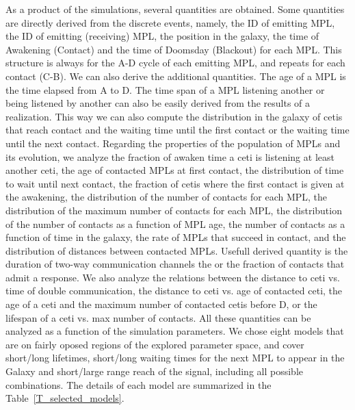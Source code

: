 As a product of the simulations, several quantities are obtained.
%
Some quantities are directly derived from the discrete events, namely,
the ID of emitting MPL, the ID of emitting (receiving) MPL, the
position in the galaxy, the time of Awakening (Contact) and the time
of Doomsday  (Blackout) for each MPL.
%
This structure is always for the A-D cycle of each emitting MPL, and
repeats for each contact (C-B).
%
We can also derive the additional quantities.
%
The age of a MPL is the time elapsed from A to D.
%
%
%
The time span of a MPL listening another or being listened by another
can also be easily derived from the results of a realization.
%
This way we can also compute the distribution in the galaxy of cetis
that reach contact and the waiting time until the first contact or the
waiting time until the next contact.
%
Regarding the properties of the population of MPLs and its evolution,
we analyze the fraction of awaken time a ceti is listening at least
another ceti, the age of contacted MPLs at first contact, the
distribution of time to wait until next contact, the fraction of cetis
where the first contact is given at the awakening, the distribution of
the number of contacts for each MPL, the distribution of the maximum
number of contacts for each MPL, the distribution of the number of
contacts as a function of MPL age, the number of contacts as a
function of time in the galaxy, the rate of MPLs that succeed in
contact, and the distribution of distances between contacted MPLs.
%
Usefull derived quantity is the duration of two-way communication
channels the or the fraction of contacts that admit a response.
% 
We also analyze the relations between the distance to ceti vs. time of
double communication, the distance to ceti vs. age of contacted ceti,
the age of a ceti and the maximum number of contacted cetis before D,
or the lifespan of a ceti vs. max number of contacts.
%
All these quantities can be analyzed as a function of the simulation
parameters.
%
We chose eight models that are on fairly oposed regions of the
explored parameter space, and cover short/long lifetimes, short/long
waiting times for the next MPL to appear in the Galaxy and
short/large range reach of the signal, including all possible
combinations.
%
The details of each model are summarized in the
Table~\ref{T_selected_models}.


